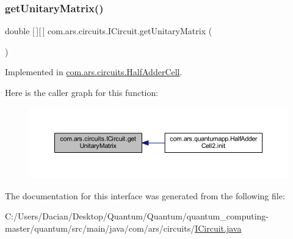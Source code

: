 \subsubsection{\texorpdfstring{get\+Unitary\+Matrix()}{getUnitaryMatrix()}}
{\footnotesize\ttfamily double \mbox{[}$\,$\mbox{]}\mbox{[}$\,$\mbox{]} com.\+ars.\+circuits.\+I\+Circuit.\+get\+Unitary\+Matrix (\begin{DoxyParamCaption}{ }\end{DoxyParamCaption})}



Implemented in \hyperlink{classcom_1_1ars_1_1circuits_1_1_half_adder_cell_a540342262612af85393e1c07675fd7e9}{com.\+ars.\+circuits.\+Half\+Adder\+Cell}.

Here is the caller graph for this function\+:
\nopagebreak
\begin{figure}[H]
\begin{center}
\leavevmode
\includegraphics[width=350pt]{interfacecom_1_1ars_1_1circuits_1_1_i_circuit_a83a4a39c153cec6a292572228eaecbbc_icgraph}
\end{center}
\end{figure}


The documentation for this interface was generated from the following file\+:\begin{DoxyCompactItemize}
\item 
C\+:/\+Users/\+Dacian/\+Desktop/\+Quantum/\+Quantum/quantum\+\_\+computing-\/master/quantum/src/main/java/com/ars/circuits/\hyperlink{_i_circuit_8java}{I\+Circuit.\+java}\end{DoxyCompactItemize}
